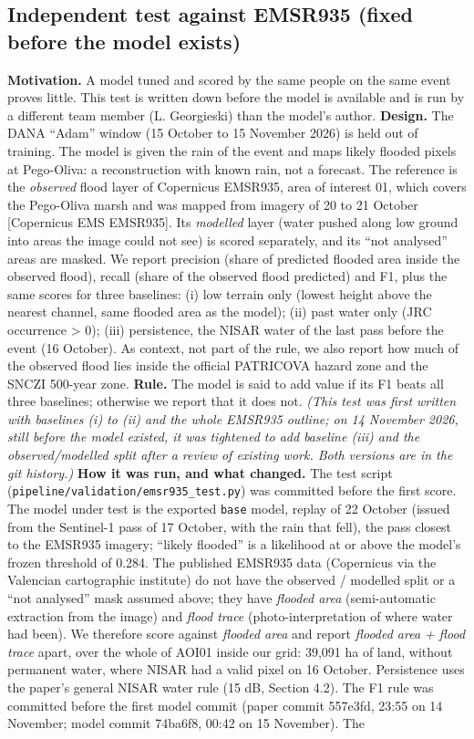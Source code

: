 \documentclass[10pt,twocolumn]{article}
\begin{document}
\subsection{Independent test against EMSR935 (fixed before the model exists)}
\textbf{Motivation.} A model tuned and scored by the same people on the same event proves little. This test is written down before the model is available and is run by a different team member (L. Georgieski) than the model's author. \textbf{Design.} The DANA ``Adam'' window (15 October to 15 November 2026) is held out of training. The model is given the rain of the event and maps likely flooded pixels at Pego-Oliva: a reconstruction with known rain, not a forecast. The reference is the \emph{observed} flood layer of Copernicus EMSR935, area of interest 01, which covers the Pego-Oliva marsh and was mapped from imagery of 20 to 21 October [Copernicus EMS EMSR935]. Its \emph{modelled} layer (water pushed along low ground into areas the image could not see) is scored separately, and its ``not analysed'' areas are masked. We report precision (share of predicted flooded area inside the observed flood), recall (share of the observed flood predicted) and F1, plus the same scores for three baselines: (i) low terrain only (lowest height above the nearest channel, same flooded area as the model); (ii) past water only (JRC occurrence > 0); (iii) persistence, the NISAR water of the last pass before the event (16 October). As context, not part of the rule, we also report how much of the observed flood lies inside the official PATRICOVA hazard zone and the SNCZI 500-year zone. \textbf{Rule.} The model is said to add value if its F1 beats all three baselines; otherwise we report that it does not. \emph{(This test was first written with baselines (i) to (ii) and the whole EMSR935 outline; on 14 November 2026, still before the model existed, it was tightened to add baseline (iii) and the observed/modelled split after a review of existing work. Both versions are in the git history.)} \textbf{How it was run, and what changed.} The test script (\texttt{pipeline/\allowbreak{}validation/\allowbreak{}emsr935\_\allowbreak{}test.\allowbreak{}py}) was committed before the first score. The model under test is the exported \texttt{base} model, replay of 22 October (issued from the Sentinel-1 pass of 17 October, with the rain that fell), the pass closest to the EMSR935 imagery; ``likely flooded'' is a likelihood at or above the model's frozen threshold of 0.284. The published EMSR935 data (Copernicus via the Valencian cartographic institute) do not have the observed / modelled split or a ``not analysed'' mask assumed above; they have \emph{flooded area} (semi-automatic extraction from the image) and \emph{flood trace} (photo-interpretation of where water had been). We therefore score against \emph{flooded area} and report \emph{flooded area + flood trace} apart, over the whole of AOI01 inside our grid: 39,091 ha of land, without permanent water, where NISAR had a valid pixel on 16 October. Persistence uses the paper's general NISAR water rule (\textminus{}15 dB, Section 4.2). The F1 rule was committed before the first model commit (paper commit 557e3fd, 23:55 on 14 November; model commit 74ba6f8, 00:42 on 15 November). The 
\end{document}
